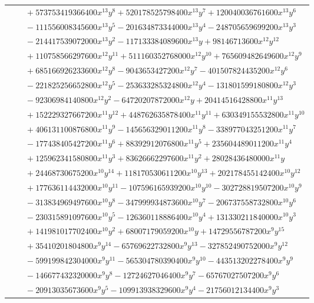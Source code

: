 \documentclass[11pt]{article}
\begin{document}
\begin{longtable}{@{}ll@{}}
 & $\quad +573753419366400x^{13}y^{8}+520178525798400x^{13}y^{7}+120040036761600x^{13}y^{6}$\\
 & $\quad -111556008345600x^{13}y^{5}-201634873344000x^{13}y^{4}-248705659699200x^{13}y^{3}$\\
 & $\quad -214417539072000x^{13}y^{2}-117133384089600x^{13}y+98146713600x^{12}y^{12}$\\
 & $\quad +110758566297600x^{12}y^{11}+511160352768000x^{12}y^{10}+765609482649600x^{12}y^{9}$\\
 & $\quad +685166926233600x^{12}y^{8}-9043653427200x^{12}y^{7}-401507824435200x^{12}y^{6}$\\
 & $\quad -221825256652800x^{12}y^{5}-253633285324800x^{12}y^{4}-131801599180800x^{12}y^{3}$\\
 & $\quad -92306984140800x^{12}y^{2}-64720207872000x^{12}y+20414516428800x^{11}y^{13}$\\
 & $\quad +152229327667200x^{11}y^{12}+448762635878400x^{11}y^{11}+630349155532800x^{11}y^{10}$\\
 & $\quad +406131100876800x^{11}y^{9}-145656329011200x^{11}y^{8}-338977043251200x^{11}y^{7}$\\
 & $\quad -177438405427200x^{11}y^{6}+88392912076800x^{11}y^{5}+235604489011200x^{11}y^{4}$\\
 & $\quad +125962341580800x^{11}y^{3}+83626662297600x^{11}y^{2}+28028436480000x^{11}y$\\
 & $\quad +24468730675200x^{10}y^{14}+118170530611200x^{10}y^{13}+202178455142400x^{10}y^{12}$\\
 & $\quad +177636114432000x^{10}y^{11}-107596165939200x^{10}y^{10}-302728819507200x^{10}y^{9}$\\
 & $\quad -313834969497600x^{10}y^{8}-347999934873600x^{10}y^{7}-206737558732800x^{10}y^{6}$\\
 & $\quad -230315891097600x^{10}y^{5}-126360118886400x^{10}y^{4}+131330211840000x^{10}y^{3}$\\
 & $\quad +141981017702400x^{10}y^{2}+68007179059200x^{10}y+14729556787200x^{9}y^{15}$\\
 & $\quad +35410201804800x^{9}y^{14}-65769622732800x^{9}y^{13}-327852490752000x^{9}y^{12}$\\
 & $\quad -599199842304000x^{9}y^{11}-565304780390400x^{9}y^{10}-443513202278400x^{9}y^{9}$\\
 & $\quad -146677432320000x^{9}y^{8}-12724627046400x^{9}y^{7}-65767027507200x^{9}y^{6}$\\
 & $\quad -20913035673600x^{9}y^{5}-109913938329600x^{9}y^{4}-21756012134400x^{9}y^{3}$\\

\end{longtable}
\end{document}
